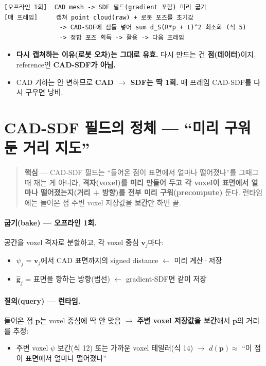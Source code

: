 \begin{lstlisting}
[오프라인 1회]  CAD mesh -> SDF 필드(gradient 포함) 미리 굽기
[매 프레임]     캡쳐 point cloud(raw) + 로봇 포즈를 초기값
               -> CAD-SDF에 점들 넣어 sum d_S(R*p + t)^2 최소화 (식 5)
               -> 정합 포즈 획득 -> 활용 -> 다음 프레임
\end{lstlisting}

\begin{itemize}
  \item \textbf{다시 캡쳐하는 이유(로봇 오차)는 그대로 유효.} 다시 만드는 건
  \textbf{점(데이터)}이지, reference인 \textbf{CAD-SDF가 아님.}
  \item CAD 기하는 안 변하므로 \textbf{CAD $\to$ SDF는 딱 1회.} 매 프레임
  CAD-SDF를 다시 구우면 낭비.
\end{itemize}

\section{CAD-SDF 필드의 정체 --- ``미리 구워둔 거리 지도''}

\begin{quote}
  \small\textbf{핵심} --- CAD-SDF 필드는 ``들어온 점이 표면에서 얼마나
  떨어졌나''를 그때그때 재는 게 아니라, \textbf{격자(voxel)를 미리 만들어 두고
  각 voxel이 표면에서 얼마나 떨어졌는지(거리 + 방향)를 전부 미리
  구워(precompute)} 둔다. 런타임에는 들어온 점 주변 voxel 저장값을
  \textbf{보간}만 하면 끝.
\end{quote}

\paragraph{굽기(bake) --- 오프라인 1회.} 공간을 voxel 격자로 분할하고, 각
voxel 중심 $\mathbf{v}_j$마다:
\begin{itemize}
  \item $\psi_j$ = $\mathbf{v}_j$에서 CAD 표면까지의 signed distance
  $\leftarrow$ 미리 계산·저장
  \item $\hat{\mathbf{g}}_j$ = 표면을 향하는 방향(법선) $\leftarrow$
  gradient-SDF면 같이 저장
\end{itemize}

\paragraph{질의(query) --- 런타임.} 들어온 점 $\mathbf{p}$는 voxel 중심에 딱
안 맞음 $\to$ \textbf{주변 voxel 저장값을 보간}해서 $\mathbf{p}$의 거리를 추정:
\begin{itemize}
  \item 주변 voxel $\psi$ 보간(식 12) 또는 가까운 voxel 테일러(식 14)
  $\to$ $d(\mathbf{p}) \approx$ ``이 점이 표면에서 얼마나 떨어졌나''
\end{itemize}

